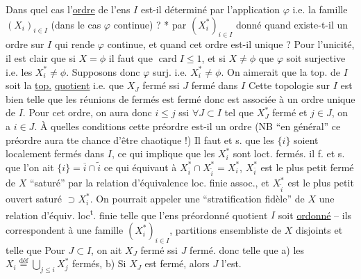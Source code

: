 Dans quel cas l'\uline{ordre} de l'ens $I$ est-il déterminé
par l'application $\varphi$ i.e. la famille $(X_i)_{i\in I}$ (dans le
cas $\varphi$ continue) ? *    par $(X_i^*)_{i\in I}$ donné
quand  existe-t-il un ordre sur $I$ qui rende $\varphi$
continue, et quand cet ordre est-il unique ?
Pour l'unicité, il est clair que si $X=\phi$ il
faut que $\operatorname{card}I\leq1$, et si $X\ne\phi$ que $\varphi$ soit
surjective i.e. les $X_i^*\ne\phi$. Supposons donc $\varphi$ surj. i.e.
$X_i^*\ne\phi$. On aimerait que la top. de $I$ soit la \uline{top.}
\uline{quotient} i.e. que $X_J$ fermé ssi $J$ fermé dans $I$
Cette topologie sur $I$ est bien telle que les réunions
de fermés est fermé  donc est associée à un ordre
unique de $I$. Pour cet ordre, on aura donc
$i\leq j$ ssi  $\forall J\subset I$ tel que $X_J^*$ fermé et $j\in J$, on
a $i\in J$. À quelles conditions cette préordre est-il
un ordre (NB ``en général'' ce préordre aura tte
chance d'être chaotique !) Il faut et s. que
les $\{i\}$ soient localement fermés dans $I$, ce
qui implique que les $X_i^*$ sont loct. fermés.  
  il f. et s. que  l'on ait 
$\{i\}=\overline i\cap\widetilde i$ ce qui équivaut à 
$X_{\overline i}^*\cap X_{\widetilde i}^*=X_i^*$,
 $X_{\overline i}^*$ est le plus petit fermé de $X$  ``saturé'' par la
relation d'équivalence loc. finie assoc., et $X_{\widetilde i}^*$ est le
plus petit ouvert saturé $\supset X_i^*$. On pourrait appeler
une ``stratification fidèle'' de $X$ une relation d'équiv.
loc\textsuperscript{t}. finie telle que l'ens préordonné quotient
$I$ soit \uline{ordonné} -- ils correspondent à une famille
$(X_i^*)_{i\in I}$, partitions ensembliste de $X$ 
 
disjoints et telle que
Pour $J\subset I$, on ait $X_J$ fermé ssi $J$ fermé.
donc telle que a) les $X_i\overset{\mathrm{déf}}=\bigcup_{j\leq i}X_j^*$ fermés,
b) Si $X_J$ est fermé, alors $J$ l'est.

